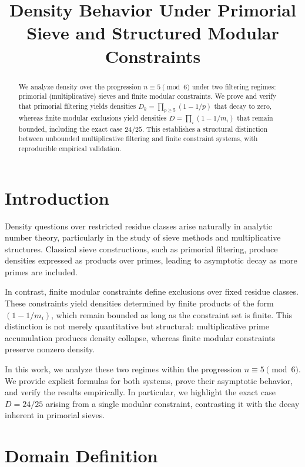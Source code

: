 \documentclass[11pt]{article}
\title{Density Behavior Under Primorial Sieve and Structured Modular Constraints}
\author{}
\date{}
\begin{document}
\maketitle

\begin{abstract}
We analyze density over the progression $n \equiv 5 \pmod{6}$ under two filtering regimes: primorial (multiplicative) sieves and finite modular constraints. We prove and verify that primorial filtering yields densities $D_k = \prod_{p \ge 5}(1 - 1/p)$ that decay to zero, whereas finite modular exclusions yield densities $D = \prod_i (1 - 1/m_i)$ that remain bounded, including the exact case $24/25$. This establishes a structural distinction between unbounded multiplicative filtering and finite constraint systems, with reproducible empirical validation.
\end{abstract}

\section{Introduction}

Density questions over restricted residue classes arise naturally in analytic number theory, particularly in the study of sieve methods and multiplicative structures. Classical sieve constructions, such as primorial filtering, produce densities expressed as products over primes, leading to asymptotic decay as more primes are included.

In contrast, finite modular constraints define exclusions over fixed residue classes. These constraints yield densities determined by finite products of the form $(1 - 1/m_i)$, which remain bounded as long as the constraint set is finite. This distinction is not merely quantitative but structural: multiplicative prime accumulation produces density collapse, whereas finite modular constraints preserve nonzero density.

In this work, we analyze these two regimes within the progression $n \equiv 5 \pmod{6}$. We provide explicit formulas for both systems, prove their asymptotic behavior, and verify the results empirically. In particular, we highlight the exact case $D = 24/25$ arising from a single modular constraint, contrasting it with the decay inherent in primorial sieves.

\section{Domain Definition}
\end{document}
